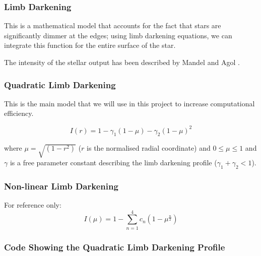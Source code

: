 \documentclass[11pt]{article}
\begin{document}
    \hypertarget{limb-darkening}{%
\subsubsection{Limb Darkening}\label{limb-darkening}}

This is a mathematical model that accounts for the fact that stars are significantly dimmer at the edges; using limb darkening equations, we can integrate this function for the entire surface of the star.

The intensity of the stellar output has been described by Mandel and Agol \parencite*{Mandel}.

\hypertarget{quadratic-limb-darkening}{%
\subsubsection{Quadratic Limb Darkening}\label{quadratic-limb-darkening}}

This is the main model that we will use in this project to increase
computational efficiency.

\begin{equation*}
I(r) = 1 - \gamma_{1}(1 - \mu) - \gamma_{2}(1 - \mu)^{2}
\end{equation*}

where \(\mu = \sqrt{(1 - r^{2})}\) (\(r\) is the normalised radial
coordinate) and \(0 \leqslant \mu \leqslant 1\) and \(\gamma\) is a free
parameter constant describing the limb darkening profile
(\(\gamma_{1} + \gamma_{2} < 1\)).

\hypertarget{non-linear-limb-darkening}{%
\subsubsection{Non-linear Limb Darkening}\label{non-linear-limb-darkening}}

For reference only: 
\begin{equation*}
I(\mu) = 1 - \sum_{n = 1}^{4} c_{n}(1 - \mu^{\frac{n}{2}})
\end{equation*}

    \hypertarget{code-showing-the-quadratic-limb-darkening-profile}{%
\subsubsection{Code Showing the Quadratic Limb Darkening Profile}\label{code-showing-the-quadratic-limb-darkening-profile}}
\end{document}
